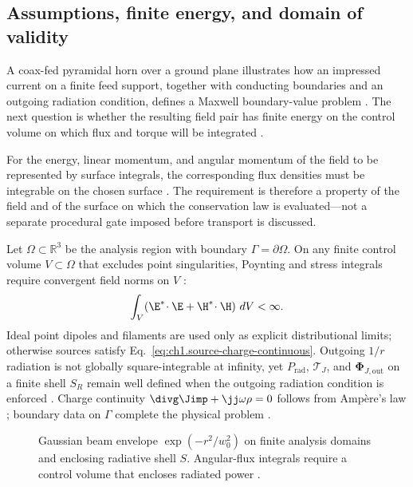 \subsection{Assumptions, finite energy, and domain of validity}
\label{sec:ch01.0.3}

A coax-fed pyramidal horn over a ground plane illustrates how an impressed current on a finite feed support, together with conducting boundaries and an outgoing radiation condition, defines a Maxwell boundary-value problem \cite{stratton1941}. The next question is whether the resulting field pair has finite energy on the control volume on which flux and torque will be integrated \cite{maxwell1873}.

For the energy, linear momentum, and angular momentum of the field to be represented by surface integrals, the corresponding flux densities must be integrable on the chosen surface \cite{poynting1884,stratton1941}. The requirement is therefore a property of the field and of the surface on which the conservation law is evaluated---not a separate procedural gate imposed before transport is discussed.

Let \(\Omega\subset\mathbb{R}^{3}\) be the analysis region with boundary \(\Gamma=\partial\Omega\). On any finite control volume \(V\subset\Omega\) that excludes point singularities, Poynting and stress integrals require convergent field norms on \(V\) \cite{poynting1884,stratton1941}:
\begin{equation}
\label{eq:ch1.energy-class}
\int_{V}\!\left(\E^*\!\cdot\E+\H^*\!\cdot\H\right)\,dV<\infty.
\end{equation}
Ideal point dipoles and filaments are used only as explicit distributional limits; otherwise sources satisfy Eq.~\eqref{eq:ch1.source-charge-continuous}. Outgoing \(1/r\) radiation is not globally square-integrable at infinity, yet \(P_{\mathrm{rad}}\), \(\boldsymbol{\mathcal{T}}_J\), and \(\boldsymbol{\Phi}_{J,\mathrm{out}}\) on a finite shell \(S_R\) remain well defined when the outgoing radiation condition is enforced \cite{stratton1941}. Charge continuity \(\divg\Jimp+\jj\omega\rho=0\) follows from Amp\`ere's law \cite{maxwell1873}; boundary data on \(\Gamma\) complete the physical problem \cite{stratton1941}.
\label{eq:ch1.admissible-space}

\begin{figure}[t]
\centering
\VolIPhysFig{\VolIPhysGaussianWaist}
\caption{Gaussian beam envelope $\exp(-r^2/w_0^2)$ on finite analysis domains and enclosing radiative shell $S$. Angular-flux integrals require a control volume that encloses radiated power \cite{allen1992,stratton1941}.}
\label{fig:ch1.wp-gaussian-waist}
\end{figure}

